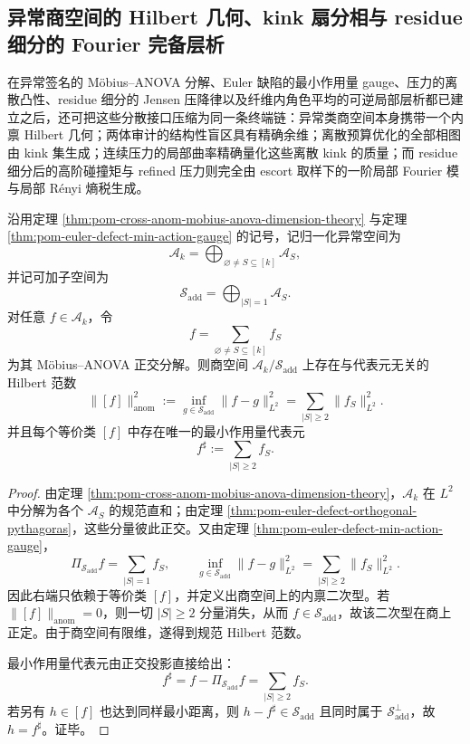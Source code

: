 \subsection{异常商空间的 Hilbert 几何、kink 扇分相与 residue 细分的 Fourier 完备层析}\label{subsec:conclusion-anomaly-hilbert-kink-residue-fourier-completion}
在异常签名的 Möbius--ANOVA 分解、Euler 缺陷的最小作用量 gauge、压力的离散凸性、residue 细分的 Jensen 压降律以及纤维内角色平均的可逆局部层析都已建立之后，还可把这些分散接口压缩为同一条终端链：异常类商空间本身携带一个内禀 Hilbert 几何；两体审计的结构性盲区具有精确余维；离散预算优化的全部相图由 kink 集生成；连续压力的局部曲率精确量化这些离散 kink 的质量；而 residue 细分后的高阶碰撞矩与 refined 压力则完全由 escort 取样下的一阶局部 Fourier 模与局部 Rényi 熵税生成。

\begin{theorem}\label{thm:conclusion-anomaly-quotient-canonical-hilbertization}
沿用定理 \ref{thm:pom-cross-anom-mobius-anova-dimension-theory} 与定理 \ref{thm:pom-euler-defect-min-action-gauge} 的记号，记归一化异常空间为
\[
\mathcal A_k=\bigoplus_{\varnothing\neq S\subseteq[k]}\mathcal A_S,
\]
并记可加子空间为
\[
\mathcal S_{\mathrm{add}}
=
\bigoplus_{|S|=1}\mathcal A_S.
\]
对任意 \(f\in \mathcal A_k\)，令
\[
f=\sum_{\varnothing\neq S\subseteq[k]} f_S
\]
为其 Möbius--ANOVA 正交分解。则商空间 \(\mathcal A_k/\mathcal S_{\mathrm{add}}\) 上存在与代表元无关的 Hilbert 范数
\[
\|[f]\|_{\mathrm{anom}}^2
:=
\inf_{g\in\mathcal S_{\mathrm{add}}}\|f-g\|_{L^2}^2
=
\sum_{|S|\ge 2}\|f_S\|_{L^2}^2.
\]
并且每个等价类 \([f]\) 中存在唯一的最小作用量代表元
\[
f^\sharp:=\sum_{|S|\ge 2}f_S.
\]
\end{theorem}
\begin{proof}
由定理 \ref{thm:pom-cross-anom-mobius-anova-dimension-theory}，\(\mathcal A_k\) 在 \(L^2\) 中分解为各个 \(\mathcal A_S\) 的规范直和；由定理 \ref{thm:pom-euler-defect-orthogonal-pythagoras}，这些分量彼此正交。又由定理 \ref{thm:pom-euler-defect-min-action-gauge}，
\[
\Pi_{\mathcal S_{\mathrm{add}}}f=\sum_{|S|=1}f_S,
\qquad
\inf_{g\in\mathcal S_{\mathrm{add}}}\|f-g\|_{L^2}^2=\sum_{|S|\ge2}\|f_S\|_{L^2}^2.
\]
因此右端只依赖于等价类 \([f]\)，并定义出商空间上的内禀二次型。若 \(\|[f]\|_{\mathrm{anom}}=0\)，则一切 \(|S|\ge2\) 分量消失，从而 \(f\in\mathcal S_{\mathrm{add}}\)，故该二次型在商上正定。由于商空间有限维，遂得到规范 Hilbert 范数。

最小作用量代表元由正交投影直接给出：
\[
f^\sharp=f-\Pi_{\mathcal S_{\mathrm{add}}}f=\sum_{|S|\ge2}f_S.
\]
若另有 \(h\in[f]\) 也达到同样最小距离，则 \(h-f^\sharp\in\mathcal S_{\mathrm{add}}\) 且同时属于 \(\mathcal S_{\mathrm{add}}^\perp\)，故 \(h=f^\sharp\)。证毕。
\end{proof}


